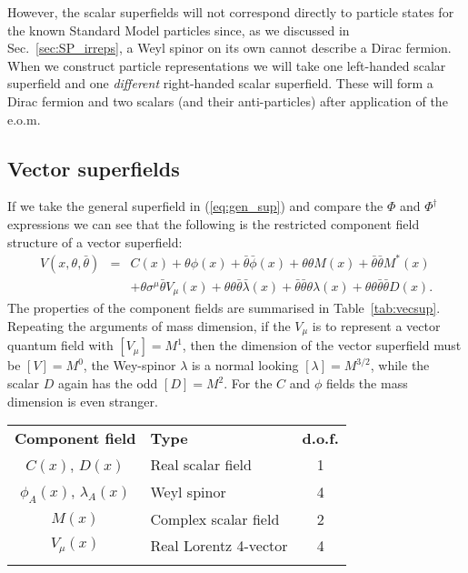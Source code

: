 \documentclass[notes.tex]{subfiles}
\begin{document}
However, the scalar superfields will not correspond directly to particle states for the known Standard Model particles since, as we discussed in Sec.~\ref{sec:SP_irreps}, a Weyl spinor on its own cannot describe a Dirac fermion. When we construct particle representations we will take one left-handed scalar superfield and one {\it different} right-handed scalar superfield. These will form a Dirac fermion and two scalars (and their anti-particles) after application of the e.o.m. 

\subsection{Vector superfields}
If we take the general superfield in (\ref{eq:gen_sup}) and compare the $\Phi$ and $\Phi^\dagger$ expressions we can see that the following is the restricted component field structure of a vector superfield:
\begin{eqnarray*}
V(x, \theta, \bar{\theta}) &=& C(x) + \theta\phi(x) + \bar{\theta}\bar{\phi}(x) + \theta\theta M(x) + \bar{\theta}\bar{\theta}M^*(x) \\
&& + \theta \sigma^\mu \bar{\theta}V_\mu(x) + \theta \theta \bar{\theta}\bar{\lambda}(x) +\bar{\theta}\bar{\theta}\theta\lambda(x) + \theta\theta\bar{\theta}\bar{\theta}D(x).
\end{eqnarray*} 
The properties of the component fields  are summarised in Table~\ref{tab:vecsup}. Repeating the arguments of mass dimension, if the $V_\mu$ is to represent a vector quantum field with $[V_\mu]=M^1$, then the dimension of the vector superfield must be $[V]=M^0$, the Wey-spinor $\lambda$ is a normal looking $[\lambda]=M^{3/2}$, while the scalar $D$ again has the odd $[D]=M^2$. For the $C$ and $\phi$ fields the mass dimension is even stranger.


\begin{center}
   \begin{tabular}{c |l| c} 
   \noalign{\smallskip}\hline\noalign{\smallskip}
   {\bf Component field} & {\bf Type} & {\bf d.o.f.} \\
   \noalign{\smallskip}\hline\noalign{\smallskip}
   $C(x)$, $D(x)$ & Real scalar field& 1\\
  $\phi_A(x)$, $\lambda_A(x)$ &Weyl spinor & 4\\
  $M(x)$ &Complex scalar field & 2\\
  $V_\mu(x)$ & Real Lorentz 4-vector & 4\\
  \noalign{\smallskip}\hline\noalign{\smallskip}
    \end{tabular}
   \end{center}
\end{document}
